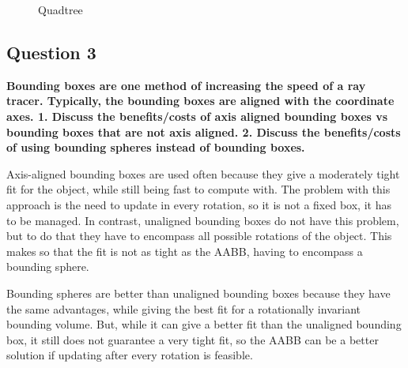\documentclass[12pt]{article}
\begin{document}
\begin{figure}
    \centering
    \caption{Quadtree}
    \label{fig:quad}
\end{figure}

\subsection*{Question 3}
{\bfseries Bounding boxes are one method of increasing the speed of a ray tracer. Typically, the bounding boxes are aligned with the coordinate axes. 1. Discuss the benefits/costs of axis aligned bounding boxes vs bounding boxes that are not axis aligned. 2. Discuss the benefits/costs of using bounding spheres instead of bounding boxes.}

Axis-aligned bounding boxes are used often because they give a moderately tight fit for the object, while still being fast to compute with. The problem with this approach is the need to update in every rotation, so it is not a fixed box, it has to be managed. In contrast, unaligned bounding boxes do not have this problem, but to do that they have to encompass all possible rotations of the object. This makes so that the fit is not as tight as the AABB, having to encompass a bounding sphere.

Bounding spheres are better than unaligned bounding boxes because they have the same advantages, while giving the best fit for a rotationally invariant bounding volume. But, while it can give a better fit than the unaligned bounding box, it still does not guarantee a very tight fit, so the AABB can be a better solution if updating after every rotation is feasible.
\end{document}
